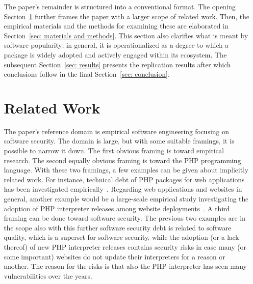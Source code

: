 \documentclass[5p, twocolumn, numbers, sort]{elsarticle}
\begin{document}
The paper's remainder is structured into a conventional format. The opening
Section~\ref{sec: related work} further frames the paper with a larger scope of
related work. Then, the empirical materials and the methods for examining these
are elaborated in Section~\ref{sec: materials and methods}. This section also
clarifies what is meant by software popularity; in general, it is
operationalized as a degree to which a package is widely adopted and actively
engaged within its ecosystem. The subsequent Section~\ref{sec: results} presents
the replication results after which conclusions follow in the final
Section~\ref{sec: conclusion}.

\section{Related Work}\label{sec: related work}

The paper's reference domain is empirical software engineering focusing on
software security. The domain is large, but with some suitable framings, it is
possible to narrow it down. The first obvious framing is toward empirical
research. The second equally obvious framing is toward the PHP programming
language. With these two framings, a few examples can be given about implicitly
related work. For instance, technical debt of PHP packages for web applications
has been investigated empirically~\cite{Amanatidis17}. Regarding web
applications and websites in general, another example would be a large-scale
empirical study investigating the adoption of PHP interpreter releases among
website deployments~\cite{Ruohonen17APSEC}. A third framing can be done toward
software security. The previous two examples are in the scope also with this
further software security  debt is related to software
quality, which is a superset for software security, while the adoption (or a
lack thereof) of new PHP interpreter releases contains security risks in case
many (or some important) websites do not update their interpreters for a reason
or another. The reason for the risks is that also the PHP interpreter has seen
many vulnerabilities over the years.
\end{document}
